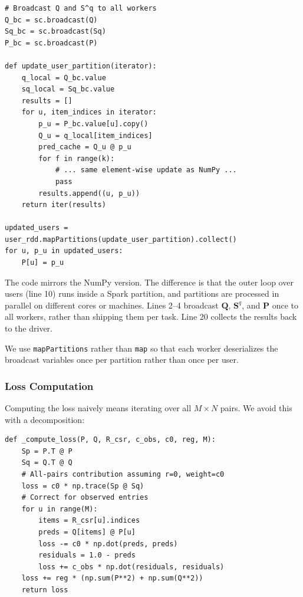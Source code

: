 \documentclass[11pt,a4paper]{article}
\begin{document}
\begin{lstlisting}[caption={User update distributed via Spark RDD.}]
# Broadcast Q and S^q to all workers
Q_bc = sc.broadcast(Q)
Sq_bc = sc.broadcast(Sq)
P_bc = sc.broadcast(P)

def update_user_partition(iterator):
    q_local = Q_bc.value
    sq_local = Sq_bc.value
    results = []
    for u, item_indices in iterator:
        p_u = P_bc.value[u].copy()
        Q_u = q_local[item_indices]
        pred_cache = Q_u @ p_u
        for f in range(k):
            # ... same element-wise update as NumPy ...
            pass
        results.append((u, p_u))
    return iter(results)

updated_users = user_rdd.mapPartitions(update_user_partition).collect()
for u, p_u in updated_users:
    P[u] = p_u
\end{lstlisting}

The code mirrors the NumPy version. The difference is that the outer loop over users (line 10) runs inside a Spark partition, and partitions are processed in parallel on different cores or machines. Lines 2--4 broadcast $\mathbf{Q}$, $\mathbf{S}^q$, and $\mathbf{P}$ once to all workers, rather than shipping them per task. Line 20 collects the results back to the driver.

We use \texttt{mapPartitions} rather than \texttt{map} so that each worker deserializes the broadcast variables once per partition rather than once per user.

\subsubsection{Loss Computation}

Computing the loss naively means iterating over all $M \times N$ pairs. We avoid this with a decomposition:

\begin{lstlisting}[caption={Efficient loss computation using the trace trick.}]
def _compute_loss(P, Q, R_csr, c_obs, c0, reg, M):
    Sp = P.T @ P
    Sq = Q.T @ Q
    # All-pairs contribution assuming r=0, weight=c0
    loss = c0 * np.trace(Sp @ Sq)
    # Correct for observed entries
    for u in range(M):
        items = R_csr[u].indices
        preds = Q[items] @ P[u]
        loss -= c0 * np.dot(preds, preds)
        residuals = 1.0 - preds
        loss += c_obs * np.dot(residuals, residuals)
    loss += reg * (np.sum(P**2) + np.sum(Q**2))
    return loss
\end{lstlisting}
\end{document}

